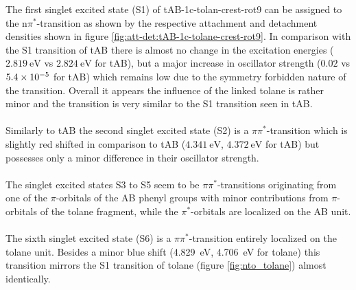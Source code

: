 %
The first singlet excited state (S1) of tAB-1c-tolan-crest-rot9 can be assigned to the n$\pi^{*}$-transition as shown by the respective attachment and detachment densities shown in figure \ref{fig:att-det:tAB-1c-tolane-crest-rot9}. 
In comparison with the S1 transition of tAB there is almost no change in the excitation energies ($\SI{2.819}{\eV}$ vs $\SI{2.824}{\eV}$ for tAB), but a major increase in oscillator strength ($0.02$ vs $\SI{5.4E-5}{}$ for tAB) which remains low due to the symmetry forbidden nature of the transition. 
Overall it appears the influence of the linked tolane is rather minor and the transition is very similar to the S1 transition seen in tAB. \\
\\
Similarly to tAB the second singlet excited state (S2) is a $\pi \pi^{*}$-transition which is slightly red shifted in comparison to tAB ($\SI{4.341}{\eV}$, $\SI{4.372}{\eV}$ for tAB) but possesses only a minor difference in their oscillator strength. \\
\\
The singlet excited states S3 to S5 seem to be $\pi\pi^*$-transitions originating from one of the $\pi$-orbitals of the AB phenyl groups with minor contributions from $\pi$-orbitals of the tolane fragment, 
while the $\pi^*$-orbitals are localized on the AB unit. \\
\\
The sixth singlet excited state (S6) is a $\pi\pi^{*}$-transition entirely localized on the tolane unit. Besides a minor blue shift (\SI{4.829}{\eV},  \SI{4,706}{\eV} for tolane) this transition mirrors the S1 transition of tolane (figure \ref{fig:nto_tolane}) almost identically.\\
